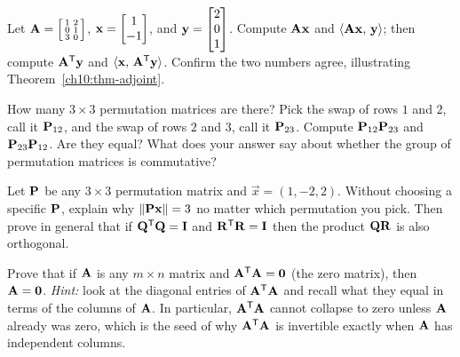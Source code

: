 \begin{exercise}\label{ch10:ex-adjoint}
Let $\mathbf{A}=\left[\begin{smallmatrix}1&2\\0&1\\3&0\end{smallmatrix}\right]$,
$\mathbf{x}=\begin{bmatrix}1\\-1\end{bmatrix}$, and $\mathbf{y}=\begin{bmatrix}2\\0\\1\end{bmatrix}$. Compute $\mathbf{A}\mathbf{x}$ and
$\langle \mathbf{A}\mathbf{x},\, \mathbf{y} \rangle$; then compute $\mathbf{A}^{\mathsf{T}}\mathbf{y}$ and $\langle \mathbf{x},\, \mathbf{A}^{\mathsf{T}}\mathbf{y} \rangle$.
Confirm the two numbers agree, illustrating Theorem~\ref{ch10:thm-adjoint}.
\end{exercise}

\begin{exercise}\label{ch10:ex-count}
How many $3\times 3$ permutation matrices are there? Pick the swap of rows $1$ and $2$, call it
$\mathbf{P}_{12}$, and the swap of rows $2$ and $3$, call it $\mathbf{P}_{23}$. Compute $\mathbf{P}_{12}\mathbf{P}_{23}$
and $\mathbf{P}_{23}\mathbf{P}_{12}$. Are they equal? What does your answer say about whether the group of
permutation matrices is commutative?
\end{exercise}

\begin{exercise}\label{ch10:ex-isometry}
Let $\mathbf{P}$ be any $3\times 3$ permutation matrix and $\vec{x}=(1,-2,2)$. Without choosing a
specific $\mathbf{P}$, explain why $\lVert\mathbf{P}\mathbf{x}\rVert=3$ no matter which permutation you pick. Then
prove in general that if $\mathbf{Q}^{\mathsf{T}}\mathbf{Q}=\mathbf{I}$ and $\mathbf{R}^{\mathsf{T}}\mathbf{R}=\mathbf{I}$ then the product
$\mathbf{Q}\mathbf{R}$ is also orthogonal.
\end{exercise}

\begin{exercise}\label{ch10:ex-proof}
Prove that if $\mathbf{A}$ is any $m\times n$ matrix and $\mathbf{A}^{\mathsf{T}}\mathbf{A}=\mathbf{0}$ (the zero matrix),
then $\mathbf{A}=\mathbf{0}$. \emph{Hint:} look at the diagonal entries of $\mathbf{A}^{\mathsf{T}}\mathbf{A}$ and recall
what they equal in terms of the columns of $\mathbf{A}$. In particular, $\mathbf{A}^{\mathsf{T}}\mathbf{A}$
cannot collapse to zero unless $\mathbf{A}$ already was zero, which is the seed of why
$\mathbf{A}^{\mathsf{T}}\mathbf{A}$ is invertible exactly when $\mathbf{A}$ has independent columns.
\end{exercise}

